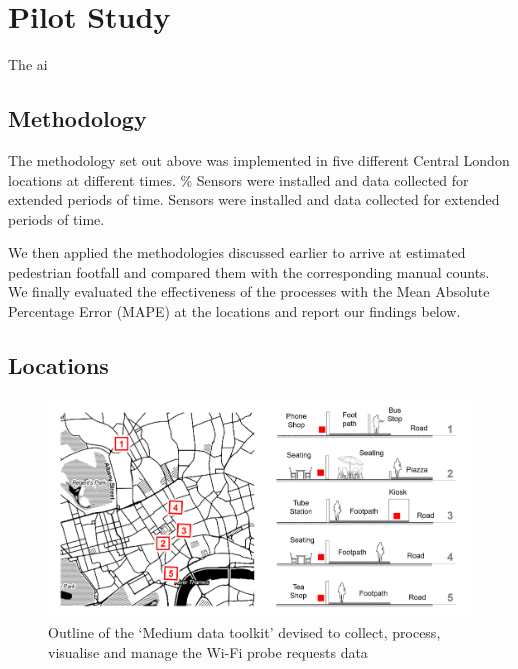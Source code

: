 \section{Pilot Study}

The ai

\subsection{Methodology}

The methodology set out above was implemented in five different Central London locations at different times.
\% Sensors were installed and data collected for extended periods of time.
Sensors were installed and data collected for extended periods of time.

We then applied the methodologies discussed earlier to arrive at estimated pedestrian footfall and compared them with the corresponding manual counts.
We finally evaluated the effectiveness of the processes with the Mean Absolute Percentage Error (MAPE) at the locations and report our findings below.


\subsection{Locations}

\begin{figure}
  \includegraphics[trim={20 20 20 20},clip]{images/pilot-study-locations.png}
  \caption{Outline of the `Medium data toolkit' devised to collect, process, visualise and manage the Wi-Fi probe requests data}
  \label{figure:literature:tech:timeline}
\end{figure}

